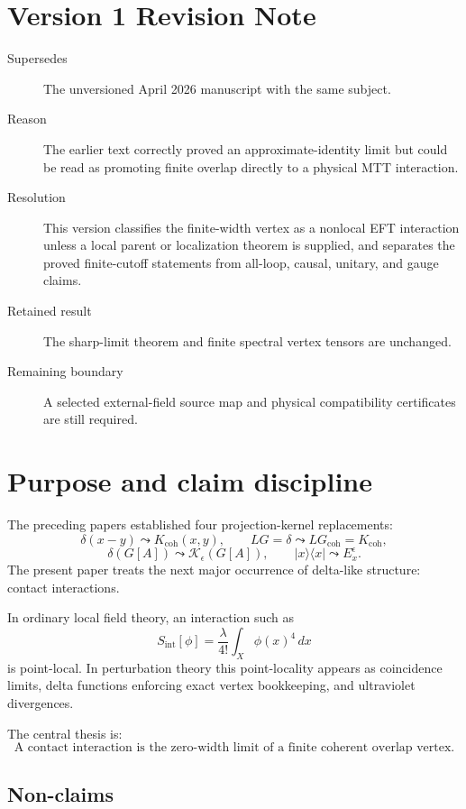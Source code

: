 \documentclass[11pt]{article}
\begin{document}
\section*{Version 1 Revision Note}
\begin{description}
\item[Supersedes] The unversioned April 2026 manuscript with the same subject.
\item[Reason] The earlier text correctly proved an approximate-identity limit but could be
read as promoting finite overlap directly to a physical MTT interaction.
\item[Resolution] This version classifies the finite-width vertex as a nonlocal EFT
interaction unless a local parent or localization theorem is supplied, and separates the
proved finite-cutoff statements from all-loop, causal, unitary, and gauge claims.
\item[Retained result] The sharp-limit theorem and finite spectral vertex tensors are
unchanged.
\item[Remaining boundary] A selected external-field source map and physical compatibility
certificates are still required.
\end{description}

\section{Purpose and claim discipline}

The preceding papers established four projection-kernel replacements:
\[
\delta(x-y)\leadsto K_{\mathrm{coh}}(x,y),
\qquad
LG=\delta\leadsto LG_{\mathrm{coh}}=K_{\mathrm{coh}},
\]
\[
\delta(G[A])\leadsto \mathcal K_{\epsilon}(G[A]),
\qquad
|x\rangle\langle x|\leadsto E_x^\epsilon .
\]
The present paper treats the next major occurrence of delta-like structure: contact
interactions.

In ordinary local field theory, an interaction such as
\[
S_{\mathrm{int}}[\phi]=\frac{\lambda}{4!}\int_X \phi(x)^4\,dx
\]
is point-local.  In perturbation theory this point-locality appears as coincidence limits,
delta functions enforcing exact vertex bookkeeping, and ultraviolet divergences.

The central thesis is:
\[
\boxed{\text{A contact interaction is the zero-width limit of a finite coherent overlap vertex.}}
\]

\subsection{Non-claims}
\end{document}
